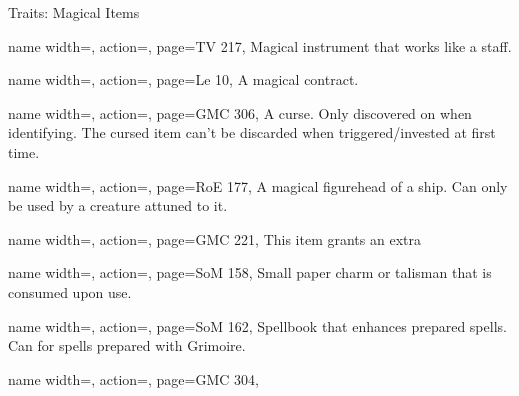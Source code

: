 \begin{PageBackLandscape}
\begin{TablesHalf}{\backTableHeight}
\begin{Table}{Traits: Magical Items}
\begin{entry}{}{%
                name width=\conditionLength,%
                action=\Coda,
                page=TV 217,
            }
                Magical instrument that works like a staff.
            \end{entry}
            \begin{entry}{}{%
                name width=\conditionLength,%
                action=\Contract,
                page=Le 10,
            }
                A magical contract.
            \end{entry}
            \begin{entry}{}{%
                name width=\conditionLength,%
                action=\Cursed,
                page=GMC 306,
            }
                A curse. Only discovered on  when identifying.
                The cursed item can't be discarded when triggered/invested at first time.
            \end{entry}
            \begin{entry}{}{%
                name width=\conditionLength,%
                action=\Figurehead,
                page=RoE 177,
            }
                A magical figurehead of a ship. Can only be used by a creature attuned to it. \hfill
            \end{entry}
            \begin{entry}{}{%
                name width=\conditionLength,%
                action=\Focused,
                page=GMC 221,
            }
                This item grants an extra  \hfill{}
            \end{entry}
            \begin{entry}{}{%
                name width=\conditionLength,%
                action=\Fulu,
                page=SoM 158,
            }
                Small paper charm or talisman that is consumed upon use.
            \end{entry}
            \begin{entry}{}{%
                name width=\conditionLength,%
                action=\Grimoire,
                page=SoM 162,
            }
                Spellbook that enhances prepared spells. Can  for spells prepared with Grimoire. \hfill
            \end{entry}
            \begin{entry}{}{%
                name width=\conditionLength,%
                action=\Intelligent,
                page=GMC 304,
            }

\end{entry}
\end{Table}
\end{TablesHalf}
\end{PageBackLandscape}
